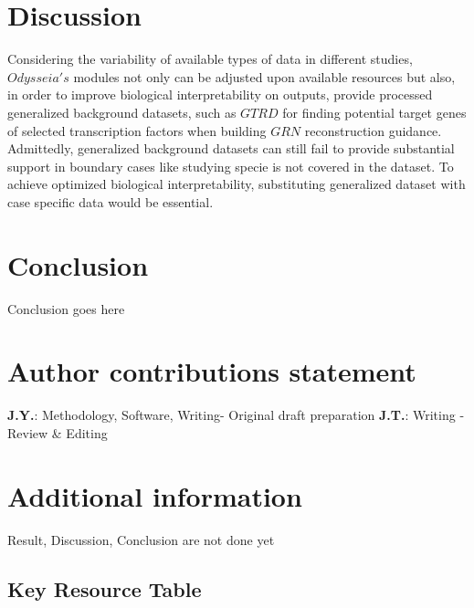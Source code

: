 \documentclass[fleqn,10pt]{wlscirep}
\begin{document}
\section*{Discussion}
\label{disc}
Considering the variability of available types of data in different studies, $Odysseia's$ modules not only can be adjusted upon available resources but also, in order to improve biological interpretability on outputs, provide processed generalized background datasets, such as $GTRD$\cite{gkaa1057} for finding potential target genes of selected transcription factors when building $GRN$ reconstruction guidance. Admittedly, generalized background datasets can still fail to provide substantial support in boundary cases like studying specie is not covered in the dataset. To achieve optimized biological interpretability, substituting generalized dataset with case specific data would be essential.



\section*{Conclusion}
\label{conc}
Conclusion goes here




\section*{Author contributions statement}
\textbf{J.Y.}: Methodology, Software, Writing- Original draft preparation
\textbf{J.T.}: Writing - Review \& Editing

\section*{Additional information}
Result, Discussion, Conclusion are not done yet


\subsection*{Key Resource Table}
\end{document}
